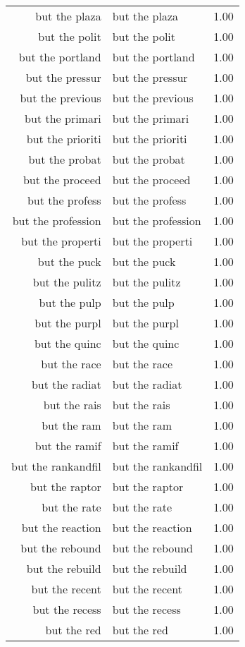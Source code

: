 \begin{table}[ht]
\begin{tabular}{rlr}
  but the plaza & but the plaza & 1.00 \\ 
  but the polit & but the polit & 1.00 \\ 
  but the portland & but the portland & 1.00 \\ 
  but the pressur & but the pressur & 1.00 \\ 
  but the previous & but the previous & 1.00 \\ 
  but the primari & but the primari & 1.00 \\ 
  but the prioriti & but the prioriti & 1.00 \\ 
  but the probat & but the probat & 1.00 \\ 
  but the proceed & but the proceed & 1.00 \\ 
  but the profess & but the profess & 1.00 \\ 
  but the profession & but the profession & 1.00 \\ 
  but the properti & but the properti & 1.00 \\ 
  but the puck & but the puck & 1.00 \\ 
  but the pulitz & but the pulitz & 1.00 \\ 
  but the pulp & but the pulp & 1.00 \\ 
  but the purpl & but the purpl & 1.00 \\ 
  but the quinc & but the quinc & 1.00 \\ 
  but the race & but the race & 1.00 \\ 
  but the radiat & but the radiat & 1.00 \\ 
  but the rais & but the rais & 1.00 \\ 
  but the ram & but the ram & 1.00 \\ 
  but the ramif & but the ramif & 1.00 \\ 
  but the rankandfil & but the rankandfil & 1.00 \\ 
  but the raptor & but the raptor & 1.00 \\ 
  but the rate & but the rate & 1.00 \\ 
  but the reaction & but the reaction & 1.00 \\ 
  but the rebound & but the rebound & 1.00 \\ 
  but the rebuild & but the rebuild & 1.00 \\ 
  but the recent & but the recent & 1.00 \\ 
  but the recess & but the recess & 1.00 \\ 
  but the red & but the red & 1.00 \\ 

\end{tabular}
\end{table}

